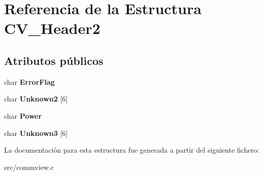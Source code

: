 \hypertarget{struct_c_v___header2}{
\section{Referencia de la Estructura CV\_\-Header2}
\label{struct_c_v___header2}
}
\subsection*{Atributos públicos}
\begin{DoxyCompactItemize}
\item 
\hypertarget{struct_c_v___header2_a662ebd84f408923a9f635cdc69ea9f4c}{
char {\bfseries ErrorFlag}}
\label{struct_c_v___header2_a662ebd84f408923a9f635cdc69ea9f4c}

\item 
\hypertarget{struct_c_v___header2_a4697a89e8e3b5ca7a7b0728151c0f317}{
char {\bfseries Unknown2} \mbox{[}6\mbox{]}}
\label{struct_c_v___header2_a4697a89e8e3b5ca7a7b0728151c0f317}

\item 
\hypertarget{struct_c_v___header2_a2e8d143c7a91d7bd575b0cda061db7bb}{
char {\bfseries Power}}
\label{struct_c_v___header2_a2e8d143c7a91d7bd575b0cda061db7bb}

\item 
\hypertarget{struct_c_v___header2_ac2f4789dd9d4ed9f96e4a0bb4b2856ff}{
char {\bfseries Unknown3} \mbox{[}6\mbox{]}}
\label{struct_c_v___header2_ac2f4789dd9d4ed9f96e4a0bb4b2856ff}

\end{DoxyCompactItemize}


La documentación para esta estructura fue generada a partir del siguiente fichero:\begin{DoxyCompactItemize}
\item 
src/commview.c\end{DoxyCompactItemize}
